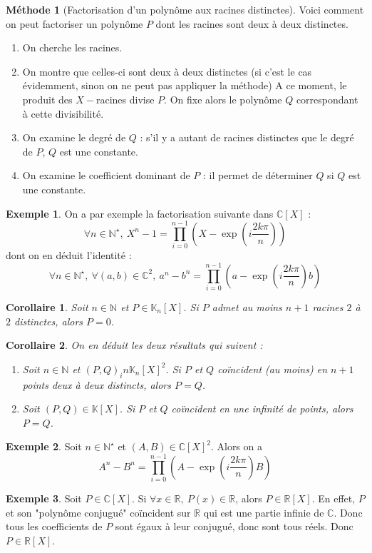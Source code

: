\documentclass[french]{book}
\newcommand{\N}{\mathbb{N}}
\newcommand{\R}{\mathbb{R}}
\newcommand{\C}{\mathbb{C}}
\newcommand{\K}{\mathbb{K}}
\newcommand{\st}{^\star}
\theoremstyle{plain}
\newtheorem{cor}{Corollaire}[chapter]
\theoremstyle{definition}
\newtheorem{exa}{Exemple}[chapter]
\newtheorem{met}{Méthode}[chapter]
\theoremstyle{remark}
\begin{document}
\begin{met}[Factorisation d'un polynôme aux racines distinctes] Voici comment on peut factoriser un polynôme $P$ dont les racines sont deux à deux distinctes.
	\begin{enumerate}
		\item On cherche les racines.
		\item On montre que celles-ci sont deux à deux distinctes (si c'est le cas évidemment, sinon on ne peut pas appliquer la méthode) A ce moment, le produit des $X-$racines divise $P$. On fixe alors le polynôme $Q$ correspondant à cette divisibilité.
		\item On examine le degré de $Q$ : s'il y a autant de racines distinctes que le degré de $P$, $Q$ est une constante.
		\item On examine le coefficient dominant de $P$ : il permet de déterminer $Q$ si $Q$ est une constante.
	\end{enumerate}
\end{met}
\begin{exa}
	On a par exemple la factorisation suivante dans $\C[X]$ : $$\forall n\in\N\st,\ X^n-1=\prod_{i=0}^{n-1}\left(X-\exp\left(i\frac{2k\pi}{n}\right)\right)$$ dont on en déduit l'identité : $$\forall n\in\N\st,\ \forall (a,b)\in\C^2,\ a^n-b^n=\prod_{i=0}^{n-1}\left(a-\exp\left(i\frac{2k\pi}{n}\right)b\right)$$
\end{exa}
\begin{cor}
	Soit $n\in\N$ et $P\in\K_n[X]$. Si $P$ admet au moins $n+1$ racines $2$ à $2$ distinctes, alors $P=0$.
\end{cor}
\begin{cor}
	On en déduit les deux résultats qui suivent :
	\begin{enumerate}
		\item Soit $n\in\N$ et $(P,Q)_in\K_n[X]^2$. Si $P$ et $Q$ coïncident (au moins) en $n+1$ points deux à deux distincts, alors $P=Q$.
		\item Soit $(P,Q)\in\K[X]$. Si $P$ et $Q$ coïncident en une infinité de points, alors $P=Q$.
	\end{enumerate}
\end{cor}
\begin{exa}
	Soit $n\in\N\st$ et $(A,B)\in\C[X]^2$. Alors on a $$A^n-B^n=\prod_{i=0}^{n-1}\left(A-\exp\left(i\frac{2k\pi}{n}\right)B\right)$$
\end{exa}
\begin{exa}
	Soit $P\in\C[X]$. Si $\forall x\in\R,\ P(x)\in\R$, alors $P\in\R[X]$. En effet, $P$ et son "polynôme conjugué" coïncident sur $\R$ qui est une partie infinie de $\C$. Donc tous les coefficients de $P$ sont égaux à leur conjugué, donc sont tous réels. Donc $P\in\R[X]$.
\end{exa}
\end{document}

